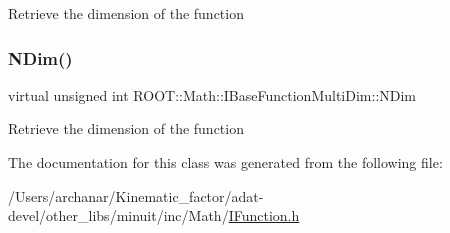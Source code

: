 Retrieve the dimension of the function \mbox{\label{classROOT_1_1Math_1_1IGradientFunctionMultiDim_af046a6f630930e59fe5356a9795aec46}} 
\subsubsection{\texorpdfstring{NDim()}{NDim()}\hspace{0.1cm}{\footnotesize\ttfamily [9/9]}}
{\footnotesize\ttfamily virtual unsigned int R\+O\+O\+T\+::\+Math\+::\+I\+Base\+Function\+Multi\+Dim\+::\+N\+Dim}

Retrieve the dimension of the function 

The documentation for this class was generated from the following file\+:\begin{DoxyCompactItemize}
\item 
/\+Users/archanar/\+Kinematic\+\_\+factor/adat-\/devel/other\+\_\+libs/minuit/inc/\+Math/\mbox{\hyperlink{adat-devel_2other__libs_2minuit_2inc_2Math_2IFunction_8h}{I\+Function.\+h}}\end{DoxyCompactItemize}
